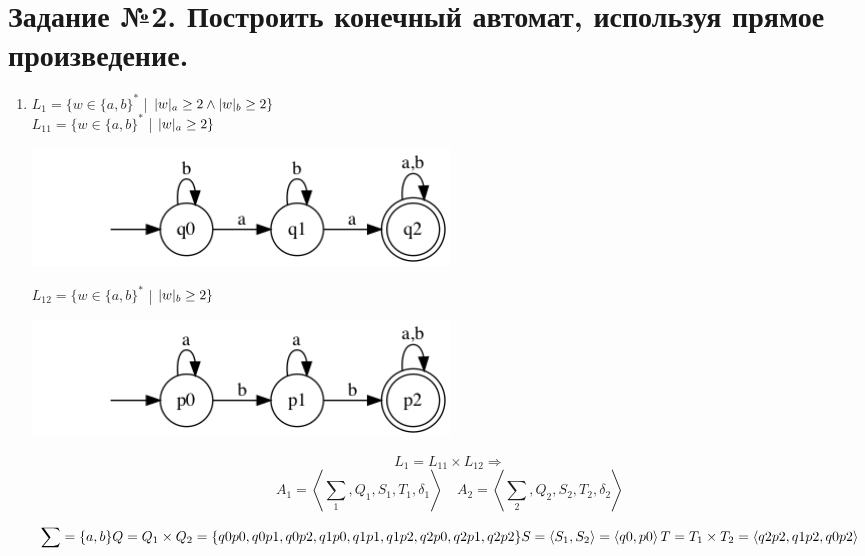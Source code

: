 \documentclass{article}
\begin{document}
\section{Задание №2. Построить конечный автомат, используя прямое произведение.}
\begin{enumerate}
\item {$L_1 = \{ w \in \{a,b\}^* $ | $ |w|_a \ge 2  \wedge   |w|_b \ge 2 \} \\ $} \\
$L_{11} = \{ w \in \{a,b\}^* $ | $ |w|_a \ge 2 \} \\$
\begin{center}
    \includegraphics[width=0.5\textwidth]{g211.png}
\end{center}

$L_{12} = \{ w \in \{a,b\}^* $ | $ |w|_b \ge 2 \} \\$
\begin{center}
    \includegraphics[width=0.5\textwidth]{g212.png}
\end{center}

\begin{center}
\[
    L_1 = L_{11} \times L_{12} \Rightarrow \]
    \[A_1 = \left\langle \sum_{1} , Q_1, S_1, T_1, \delta_1\right\rangle \quad 
    A_2 = \left\langle \sum_{2}, Q_2, S_2, T_2, \delta_2\right\rangle
\]

\[
    \sum = \{a, b\} \\
    Q = Q_1 \times Q_2 = \{q0p0, q0p1, q0p2, q1p0, q1p1, q1p2, q2p0, q2p1, q2p2\} \\
    S = \left\langle S_1, S_2 \right\rangle = \left\langle q0,p0 \right\rangle \\
    T = T_1 \times T_2 = \left\langle q2p2, q1p2, q0p2 \right\rangle
\]
\end{center}




\end{enumerate}
\end{document}
